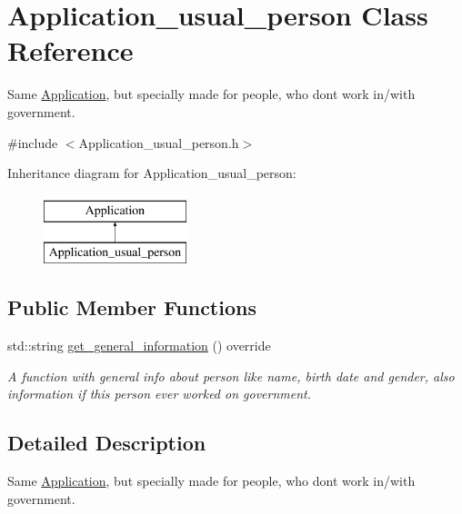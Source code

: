 \hypertarget{classApplication__usual__person}{}\section{Application\+\_\+usual\+\_\+person Class Reference}
\label{classApplication__usual__person}


Same \mbox{\hyperlink{classApplication}{Application}}, but specially made for people, who don\textquotesingle{}t work in/with government.  




{\ttfamily \#include $<$Application\+\_\+usual\+\_\+person.\+h$>$}

Inheritance diagram for Application\+\_\+usual\+\_\+person\+:\begin{figure}[H]
\begin{center}
\leavevmode
\includegraphics[height=2.000000cm]{classApplication__usual__person}
\end{center}
\end{figure}
\subsection*{Public Member Functions}
\begin{DoxyCompactItemize}
\item 
std\+::string \mbox{\hyperlink{classApplication__usual__person_a6ea5c42c57eb422761d4b208eb8ffaca}{get\+\_\+general\+\_\+information}} () override
\begin{DoxyCompactList}\small\item\em A function with general info about person like name, birth date and gender, also information if this person ever worked on government. \end{DoxyCompactList}\end{DoxyCompactItemize}


\subsection{Detailed Description}
Same \mbox{\hyperlink{classApplication}{Application}}, but specially made for people, who don\textquotesingle{}t work in/with government. 

